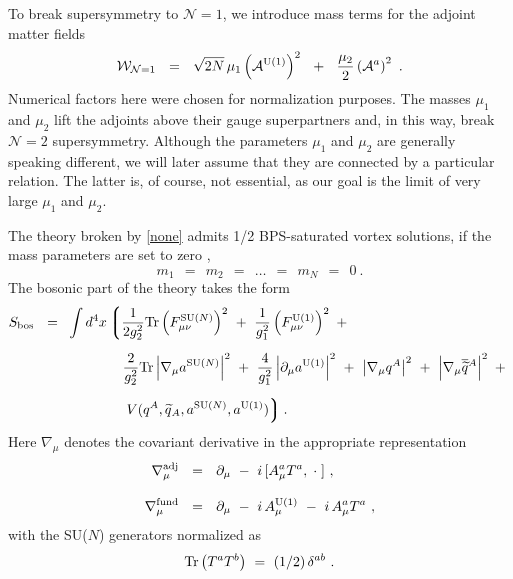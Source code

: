 \documentclass[12pt]{article}
\def\beq{\begin{equation}}
\def\eeq{\end{equation}}
\def\Tr{{\rm Tr}}
\newcommand{\ntwo}{${\mathcal N}=2$ }
\newcommand{\nonen}{${\mathcal N}=1$}
\newcommand{\p}{\partial}
\newcommand{\wt}{\widetilde}
\newcommand{\ov}{\overline}
\newcommand{\mc}[1]{\mathcal{#1}}
\newcommand{\lgr}{\left\lgroup}
\newcommand{\rgr}{\right\rgroup}
\newcommand{\aU}{a^{\rm U(1)}}
\newcommand{\aN}{a^\text{SU($N$)}}
\begin{document}
To break supersymmetry to \nonen, we introduce mass terms for the adjoint matter fields
\beq
\label{none}
	\mc{W}_{\mc{N}=1} ~~=~~ \sqrt{2N}\,\mu_1 \left(\mc{A}^{\rm U(1)}\right)^2  ~~+~~
				\frac{\mu_2}{2} \left( \mc{A}^a \right)^2 ~.
\eeq
Numerical factors here were chosen for normalization purposes. 
The masses $ \mu_1 $ and $ \mu_2 $ lift the adjoints above their gauge superpartners and,
in  this way, break \ntwo
supersymmetry.
Although the parameters $ \mu_1 $ and $ \mu_2 $ are generally speaking different, we will later assume that
they are connected by a particular relation.
The latter is, of course, not essential, as our goal is the limit of very large $ \mu_1$ and $\mu_2$. 

The theory broken by \eqref{none} admits 1/2 BPS-saturated vortex solutions, if the mass parameters
are set to zero \cite{SYrev,SYnone,Edalati},
\beq
\label{qmasses}
	m_1 ~~=~~ m_2 ~~=~~ \dots ~~=~~ m_N ~~=~~ 0~.
\eeq
The bosonic part of the theory takes the form
\begin{align}
%
\label{theory}
	S_{\rm bos} ~~=~~ & \int d^4 x 
		\lgr
			\frac{1}{2g_2^2}\Tr \left(F_{\mu\nu}^\text{SU($N$)}\right)^2  ~+~
			\frac{1}{g_1^2} \left(F_{\mu\nu}^{\rm U(1)}\right)^2 ~+~ 
			\right. 
			\\[2mm]
%
\notag
		&
			\phantom{int d^4 x \lgr\right.}
			\frac{2}{g_2^2}\Tr \left|\nabla_\mu \aN \right|^2   ~+~
			\frac{4}{g_1^2} \left|\p_\mu \aU \right|^2
			~+~
			\left| \nabla_\mu q^A \right|^2 ~+~ \left|\nabla_\mu \ov{\wt{q}}{}^A \right|^2 
			~+~
			\\[2mm]
%
\notag
		&
			\phantom{int d^4 x \lgr\right.}
		\left.
			V(q^A, \wt{q}{}_A, \aN, \aU)
		\rgr .
\end{align}
Here $ \nabla_\mu $ denotes the covariant derivative in the appropriate representation
\begin{align*}
%
	\nabla_\mu^{\rm adj} & ~~=~~ \p_\mu  ~-~ i\, [ A_\mu^a T^a, \;\cdot\;]~, \\[3mm]
%
	\nabla_\mu^{\rm fund} & ~~=~~ \p_\mu ~-~ i\,A^{\rm U(1)}_\mu ~-~ i\, A_\mu^a T^a~,
\end{align*}
with the SU($N$) generators normalized as
\[
	\Tr \left( T^a T^b \right) ~=~ (1/2) \, \delta^{ab}~.
\]
\end{document}
